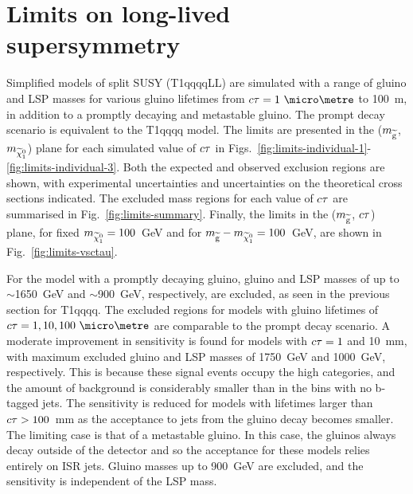 \section{Limits on long-lived supersymmetry}
\label{sec:results-limits}
Simplified models of split SUSY (T1qqqqLL) are simulated with a range of gluino 
and LSP masses for various gluino lifetimes from $\ctau = 1~\micro\metre$ to 
100~m, in addition to a 
promptly decaying and metastable gluino. The prompt decay scenario is 
equivalent to the T1qqqq model. The limits are presented in 
the ($m_{\mathrm{\widetilde{g}}}$, $m_{\widetilde{\chi}_1^0}$) plane for each simulated value of $c\tau$ in 
Figs.~\ref{fig:limits-individual-1}-\ref{fig:limits-individual-3}.
Both the expected and observed exclusion regions are shown, with experimental 
uncertainties and uncertainties on the theoretical cross sections indicated. 
The excluded mass regions for each value of $c\tau$ are summarised in 
Fig.~\ref{fig:limits-summary}. 
Finally, the limits in the ($m_{\mathrm{\widetilde{g}}}$, $c\tau$) plane, for fixed $m_{\widetilde{\chi}_1^0}=100$~GeV 
and for $m_{\mathrm{\widetilde{g}}} - m_{\widetilde{\chi}_1^0} = 100$~GeV, are shown in Fig.~\ref{fig:limits-vsctau}.


For the model with a promptly decaying gluino, gluino and LSP masses of up to 
$\sim$1650~GeV and $\sim$900~GeV, respectively, are excluded, as seen in the 
previous section for T1qqqq. The excluded 
regions for models with gluino lifetimes of $\ctau = 1, 10, 100~\micro\metre$ 
are comparable to the prompt decay scenario. 
A moderate improvement in sensitivity is found for models with $c\tau = 1$ and 
10~mm, with maximum excluded gluino and LSP masses of 1750~GeV and 1000~GeV, 
respectively. This is because these signal events occupy the high \nb 
categories, and the amount of background is considerably smaller than in the 
bins with no b-tagged jets. 
The sensitivity is reduced for models with lifetimes larger than $c\tau > 
100$~mm as the acceptance to jets from the gluino decay becomes smaller. The 
limiting case is that of a metastable gluino. In this case, the gluinos always 
decay outside of the detector and so the acceptance for these models relies 
entirely on ISR jets. Gluino masses up to 900~GeV are excluded, and the 
sensitivity is independent of the LSP mass.

